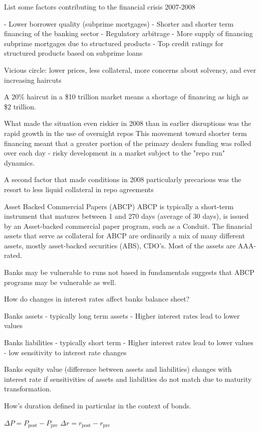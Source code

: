 List some factors contributing to the financial crisis 2007-2008

- Lower borrower quality (subprime mortgages)
- Shorter and shorter term financing of the banking sector
- Regulatory arbitrage
- More supply of financing subprime mortgages due to structured
products
- Top credit ratings for structured products based on subprime
loans

Vicious circle: lower prices, less collateral, more concerns
about solvency, and ever increasing haircuts

A 20\% haircut in a \$10 trillion market
means a shortage
of financing as
high as \$2 trillion.

What made the situation even riskier in 2008 than in earlier disruptions was the
rapid growth in the use of overnight repos
This movement toward shorter term financing meant that a greater portion of the
primary dealers funding was rolled over each day - risky development in a
market subject to the "repo run" dynamics. 

A second factor that made conditions in 2008 particularly precarious was the
resort to less liquid collateral in repo agreements

Asset Backed Commercial Papers (ABCP)
ABCP is typically a short-term instrument that matures between 1 and 270 days (average of 30 days),
is issued by an Asset-backed commercial paper program, such as a Conduit.
The financial assets that serve as collateral for ABCP are ordinarily a mix of many different assets, 
mostly asset-backed securities (ABS), CDO's. Most of the assets are AAA-rated.

Banks may be vulnerable to runs not based in fundamentals suggests
that ABCP programs may be vulnerable as well.


How do changes in interest rates affect banks balance sheet?

Banks assets
- typically long term assets
- Higher interest rates lead to lower values

Banks liabilities
- typically short term
- Higher interest rates lead to lower values
- low sensitivity to interest rate changes

Banks equity value (difference between assets and
liabilities) changes with interest rate if sensitivities of assets
and liabilities do not match due to maturity transformation.


How's duration defined in particular in the context of bonds.

\( \Delta P = P_{\text{post}} - P_{\text{pre}}\)
\( \Delta r = r_{\text{post}} - r_{\text{pre}}\)

